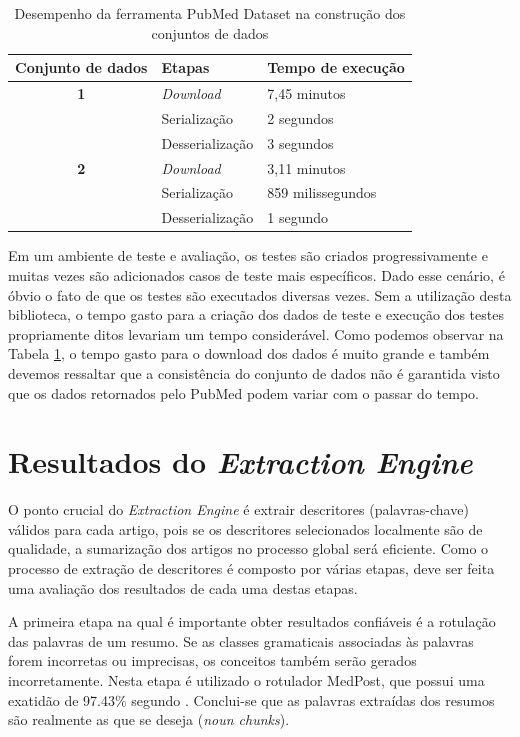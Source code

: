 \begin{table}[htbp]
\center
\begin{tabular}{|l|l|l|}
\hline
\textbf{Conjunto de dados} & \textbf{Etapas} & \textbf{Tempo de execução} \\ \hline
\multicolumn{ 1}{|c|}{\textbf{1}} & \textit{Download} & 7,45 minutos \\ \cline{ 2- 3}
\multicolumn{ 1}{|l|}{} & Serialização & 2 segundos \\ \cline{ 2- 3}
\multicolumn{ 1}{|l|}{} & Desserialização & 3 segundos \\ \hline
\multicolumn{ 1}{|c|}{\textbf{2}} & \textit{Download} & 3,11 minutos \\ \cline{ 2- 3}
\multicolumn{ 1}{|l|}{} & Serialização & 859 milissegundos \\ \cline{ 2- 3}
\multicolumn{ 1}{|l|}{} & Desserialização & 1 segundo \\ \hline
\end{tabular}
\caption{Desempenho da ferramenta PubMed Dataset na construção dos conjuntos de dados}
\label{tab:tempoExecucao}
\end{table}

Em um ambiente de teste e avaliação, os testes são criados progressivamente e muitas vezes são adicionados casos de teste mais específicos. Dado esse cenário, é óbvio o fato de que os testes são executados diversas vezes. Sem a utilização desta biblioteca, o tempo gasto para a criação dos dados de teste e execução dos testes propriamente ditos levariam um tempo
considerável. Como podemos observar na Tabela \ref{tab:tempoExecucao}, o tempo gasto para o download dos dados é muito grande e também devemos ressaltar que a consistência do conjunto de dados não é garantida visto que os dados retornados pelo PubMed podem variar com o passar do tempo.

\section{Resultados do \emph{Extraction Engine}}

O ponto crucial do \emph{Extraction Engine} é extrair descritores (palavras-chave) válidos para cada artigo, pois se os descritores selecionados localmente são de qualidade, a sumarização dos artigos no processo global será eficiente. Como o processo de extração de descritores é composto por várias etapas, deve ser feita uma avaliação dos resultados de cada uma destas etapas.

A primeira etapa na qual é importante obter resultados confiáveis é a rotulação das palavras de um resumo. Se as classes gramaticais associadas às palavras forem incorretas ou imprecisas, os conceitos também serão gerados incorretamente.  Nesta etapa é utilizado o rotulador MedPost, que possui uma exatidão de 97.43\% segundo \cite{Smith2004}. Conclui-se que as palavras extraídas dos resumos são realmente as que se deseja (\emph{noun chunks}).

